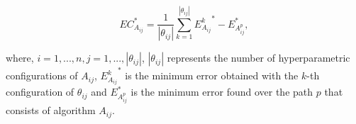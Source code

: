 \begin{equation}
\label{eq_alg1}
EC_{A_{ij}}^* = \frac{1}{|\theta_{ij}|}\sum_{k=1}^{|\theta_{ij}|} {E_{A_{ij}}^k}^* - {E_{A_{ij}^p}^*},
\end{equation}

where, $i = {1, ..., n}, j = {1, ..., |\theta_{ij}|}$, $|\theta_{ij}|$ represents the number of hyperparametric configurations of $A_{ij}$,  ${E_{A_{ij}}^k}^*$ is the minimum error obtained with the $k$-th configuration of $\theta_{ij}$ and $E_{A_{ij}^p}^*$ is the minimum error found over the path $p$ that consists of algorithm $A_{ij}$.

